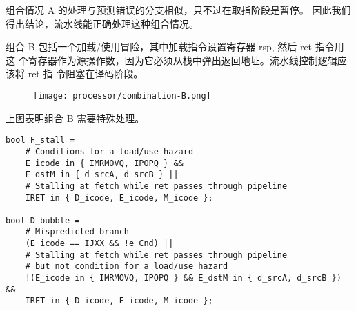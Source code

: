 组合情况 A 的处理与预测错误的分支相似，只不过在取指阶段是暂停。
因此我们得出结论，流水线能正确处理这种组合情况。

组合 B 包括一个加载/使用冒险，其中加载指令设置寄存器 rsp, 然后 ret 指令用这
个寄存器作为源操作数，因为它必须从栈中弹出返回地址。流水线控制逻辑应该将 ret 指
令阻塞在译码阶段。
\begin{figure}[H]
    \centering
    \texttt{[image: processor/combination-B.png]}
\end{figure}

上图表明组合 B 需要特殊处理。
\begin{lstlisting}[style=CStyle]
bool F_stall =
    # Conditions for a load/use hazard
    E_icode in { IMRMOVQ, IPOPQ } &&
    E_dstM in { d_srcA, d_srcB } ||
    # Stalling at fetch while ret passes through pipeline
    IRET in { D_icode, E_icode, M_icode };

bool D_bubble =
    # Mispredicted branch
    (E_icode == IJXX && !e_Cnd) ||
    # Stalling at fetch while ret passes through pipeline
    # but not condition for a load/use hazard
    !(E_icode in { IMRMOVQ, IPOPQ } && E_dstM in { d_srcA, d_srcB }) &&
    IRET in { D_icode, E_icode, M_icode };
\end{lstlisting}

\newpage